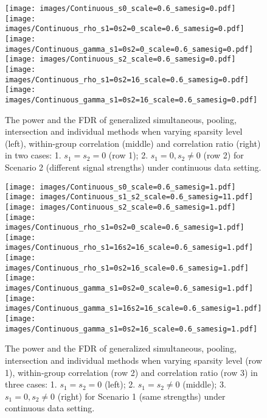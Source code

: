\documentclass[11pt]{article}
\theoremstyle{plain}
\theoremstyle{definition}
\theoremstyle{remark}
\newcommand{\0}{\mathbf{0}}
\begin{document}
\begin{figure}[h!]
    \centering
    \texttt{[image: images/Continuous\_s0\_scale=0.6\_samesig=0.pdf]}
    \texttt{[image: images/Continuous\_rho\_s1=0s2=0\_scale=0.6\_samesig=0.pdf]}
    \texttt{[image: images/Continuous\_gamma\_s1=0s2=0\_scale=0.6\_samesig=0.pdf]}\\
    \texttt{[image: images/Continuous\_s2\_scale=0.6\_samesig=0.pdf]}
    \texttt{[image: images/Continuous\_rho\_s1=0s2=16\_scale=0.6\_samesig=0.pdf]}
    \texttt{[image: images/Continuous\_gamma\_s1=0s2=16\_scale=0.6\_samesig=0.pdf]}
    \caption{The power and the FDR of generalized simultaneous, pooling, intersection and individual methods when varying sparsity level (left), within-group correlation (middle) and correlation ratio (right) in two cases: 1. $s_1=s_2=0$ (row 1); 2. $s_1=0, s_2 \neq 0$ (row 2)  for Scenario 2 (different signal strengths) under continuous data setting.}
    \label{fig:figure3}
\end{figure}


\begin{figure}[h!]
    \centering
    \texttt{[image: images/Continuous\_s0\_scale=0.6\_samesig=1.pdf]}
    \texttt{[image: images/Continuous\_s1\_s2\_scale=0.6\_samesig=11.pdf]}
    \texttt{[image: images/Continuous\_s2\_scale=0.6\_samesig=1.pdf]}\\
    \texttt{[image: images/Continuous\_rho\_s1=0s2=0\_scale=0.6\_samesig=1.pdf]}
    \texttt{[image: images/Continuous\_rho\_s1=16s2=16\_scale=0.6\_samesig=1.pdf]}
    \texttt{[image: images/Continuous\_rho\_s1=0s2=16\_scale=0.6\_samesig=1.pdf]}\\
    \texttt{[image: images/Continuous\_gamma\_s1=0s2=0\_scale=0.6\_samesig=1.pdf]}
    \texttt{[image: images/Continuous\_gamma\_s1=16s2=16\_scale=0.6\_samesig=1.pdf]}
    \texttt{[image: images/Continuous\_gamma\_s1=0s2=16\_scale=0.6\_samesig=1.pdf]}
    \caption{The power and the FDR of generalized simultaneous, pooling, intersection and individual methods when varying sparsity level (row 1), within-group correlation (row 2) and correlation ratio (row 3) in three cases: 1. $s_1=s_2=0$ (left); 2. $s_1=s_2 \neq 0$ (middle); 3. $s_1=0, s_2 \neq 0$ (right)  for Scenario 1 (same strengths) under continuous data setting.}
    \label{fig:figure4}
\end{figure}
\end{document}
